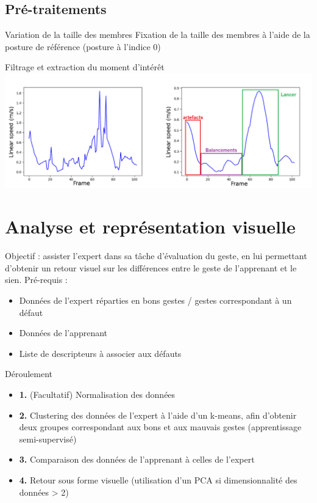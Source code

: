 \documentclass[svgnames]{beamer}
\begin{document}
	\subsection{Pré-traitements}
	\begin{frame}{\subsecname}
		\begin{block}{Variation de la taille des membres}
			Fixation de la taille des membres à l'aide de la posture de référence (posture à l'indice 0)
		\end{block}
		
	\begin{block}{Filtrage et extraction du moment d'intérêt}
		\centering
			\includegraphics[scale=0.35]{img/before_after_savgol_complete.png}
	\end{block}
		
	\end{frame}
	
	\section{Analyse et représentation visuelle}
	\begin{frame}{\secname}
	Objectif : assister l'expert dans sa tâche d'évaluation du geste, en lui permettant d'obtenir un retour visuel sur les différences entre le geste de l'apprenant et le sien.
	Pré-requis :
	\begin{itemize}[label=$\bullet$]
		\item Données de l'expert réparties en bons gestes / gestes correspondant à un défaut
		\item Données de l'apprenant
		\item Liste de descripteurs à associer aux défauts
	\end{itemize}
	\end{frame}
	
	\begin{frame}{Déroulement}
	\begin{itemize}
		\item \textbf{1.} (Facultatif) Normalisation des données
		\item \textbf{2.} Clustering des données de l'expert à l'aide d'un k-means, afin d'obtenir deux groupes correspondant aux bons et aux mauvais gestes (apprentissage semi-supervisé)
		\item \textbf{3.} Comparaison des données de l'apprenant à celles de l'expert
		\item \textbf{4.} Retour sous forme visuelle (utilisation d'un PCA si dimensionnalité des données > 2)
	\end{itemize}
	
	\end{frame}
	
\end{document}
